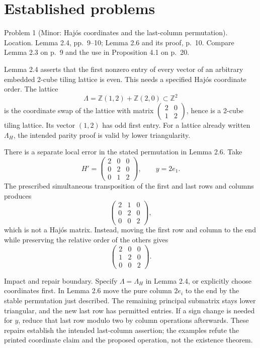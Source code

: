 \documentclass[10pt]{article}
\begin{document}
\section*{Established problems}
Problem 1 (Minor: Hajós coordinates and the last-column permutation).  Location. Lemma 2.4, pp. 9–10; Lemma 2.6 and its proof, p. 10. Compare Lemma 2.3 on p. 9 and the use in Proposition 4.1 on p. 20.\par
Lemma 2.4 asserts that the first nonzero entry of every vector of an arbitrary embedded 2-cube tiling lattice is even. This needs a specified Hajós coordinate order. The lattice \[\Lambda=\mathbb Z(1,2)+\mathbb Z(2,0)\subset\mathbb Z^2                 \tag{2.1}\] is the coordinate swap of the lattice with matrix \(\left(\begin{smallmatrix}2&0\\1&2\end{smallmatrix}\right)\), hence is a 2-cube tiling lattice. Its vector \((1,2)\) has odd first entry. For a lattice already written \(\Lambda_H\), the intended parity proof is valid by lower triangularity.\par
There is a separate local error in the stated permutation in Lemma 2.6. Take \[H'=\begin{pmatrix}2&0&0\\0&2&0\\0&1&2\end{pmatrix},
 \qquad y=2e_1.\] The prescribed simultaneous transposition of the first and last rows and columns produces \[\begin{pmatrix}2&1&0\\0&2&0\\0&0&2\end{pmatrix},                 \tag{2.2}\] which is not a Hajós matrix. Instead, moving the first row and column to the end while preserving the relative order of the others gives \[\begin{pmatrix}2&0&0\\1&2&0\\0&0&2\end{pmatrix}.                 \tag{2.3}\]\par
Impact and repair boundary. Specify \(\Lambda=\Lambda_H\) in Lemma 2.4, or explicitly choose coordinates first. In Lemma 2.6 move the pure column \(2e_i\) to the end by the stable permutation just described. The remaining principal submatrix stays lower triangular, and the new last row has permitted entries. If a sign change is needed for \(y\), reduce that last row modulo two by column operations afterwards. These repairs establish the intended last-column assertion; the examples refute the printed coordinate claim and the proposed operation, not the existence theorem.\par
\end{document}
